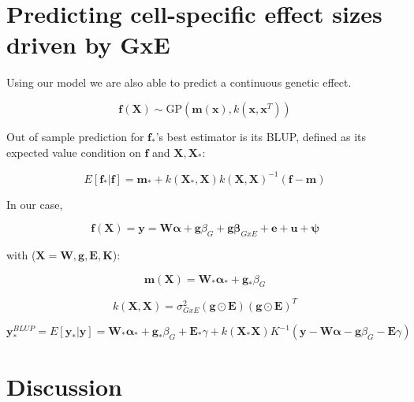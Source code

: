 \section{Predicting cell-specific effect sizes driven by GxE}

Using our model we are also able to predict a continuous genetic effect.
 

\begin{equation}
    \mathbf{f}(\mathbf{X}) \sim \mathrm{GP}(\mathbf{m}(\mathbf{x}), k(\mathbf{x},\mathbf{x}^T))
\end{equation}

Out of sample prediction for $\mathbf{f}_*$'s best estimator is its BLUP, defined as its expected value condition on $\mathbf{f}$ and $\mathbf{X},\mathbf{X}_*$:

\begin{equation}
    E[\mathbf{f}_*|\mathbf{f}] = \mathbf{m}_* +k(\mathbf{X}_*,\mathbf{X})k(\mathbf{X},\mathbf{X})^{-1}(\mathbf{f}-\mathbf{m})
\end{equation}

In our case,

\begin{equation}
    \mathbf{f}(\mathbf{X}) = \mathbf{y} = \mathbf{W}\boldsymbol{\alpha}+\mathbf{g}\beta_G+\mathbf{g}\boldsymbol{\beta}_{GxE}+\mathbf{e} + \mathbf{u} + \boldsymbol{\psi}
\end{equation}

with ($\mathbf{X} = {\mathbf{W},\mathbf{g},\mathbf{E},\mathbf{K}}$):

\begin{equation}
    \mathbf{m}(\mathbf{X}) = \mathbf{W}_*\boldsymbol{\alpha}_{*}+\mathbf{g}_*\beta_G
\end{equation}

\begin{equation}
    k(\mathbf{X},\mathbf{X}) = \sigma_{GxE}^2(\mathbf{g}\odot\mathbf{E})(\mathbf{g}\odot\mathbf{E})^T
\end{equation}

\begin{equation}
\mathbf{y}_{*}^{BLUP} = E[\mathbf{y}_*|\mathbf{y}] = 
\mathbf{W}_*\boldsymbol{\alpha}_{*}+\mathbf{g}_*\beta_G+\mathbf{E}_*\gamma + 
k(\mathbf{X}_*\mathbf{X})K^{-1}(\mathbf{y}-\mathbf{W}\boldsymbol{\alpha}-\mathbf{g}\beta_G-\mathbf{E}\gamma)
\end{equation}



\section{Discussion}

